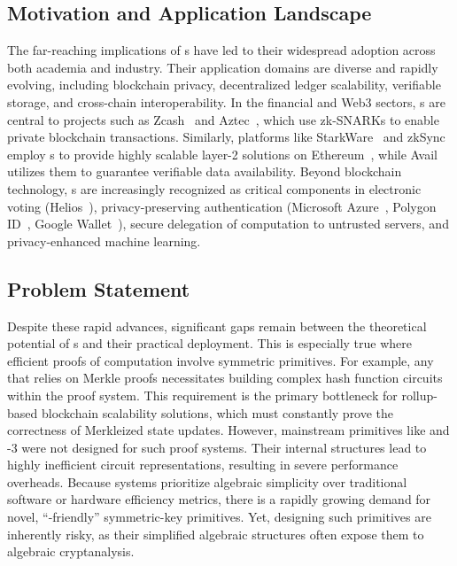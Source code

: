 	\subsection{Motivation and Application Landscape}
	The far-reaching implications of s have led to their widespread adoption across both academia and industry.
	Their application domains are diverse and rapidly evolving, including blockchain privacy, decentralized ledger scalability, verifiable storage, and cross-chain interoperability. 
	In the financial and Web3 sectors, s are central to projects such as Zcash~\cite{zcash} and Aztec~\cite{aztec}, which use zk-SNARKs to enable private blockchain transactions.
	Similarly, platforms like StarkWare~\cite{starkware} and zkSync~\cite{zksync} employ s to provide highly scalable layer-2 solutions on Ethereum~\cite{ethereum}, while Avail~\cite{avail} utilizes them to guarantee verifiable data availability.
	Beyond blockchain technology, s are increasingly recognized as critical components in electronic voting (Helios~\cite{helios}), privacy-preserving authentication (Microsoft Azure~\cite{azureprivacy}, Polygon ID~\cite{polygonid}, Google Wallet~\cite{googlewallet}), secure delegation of computation to untrusted servers, and privacy-enhanced machine learning.
	
	\subsection{Problem Statement}
	Despite these rapid advances, significant gaps remain between the theoretical potential of s and their practical deployment.
	This is especially true where efficient proofs of computation involve symmetric primitives.
	For example, any  that relies on Merkle proofs necessitates building complex hash function circuits within the proof system.
	This requirement is the primary bottleneck for rollup-based blockchain scalability solutions, which must constantly prove the correctness of Merkleized state updates.
	However, mainstream primitives like  and -3 were not designed for such proof systems.
	Their internal structures lead to highly inefficient circuit representations, resulting in severe performance overheads.
	Because  systems prioritize algebraic simplicity over traditional software or hardware efficiency metrics, there is a rapidly growing demand for novel, ``-friendly'' symmetric-key primitives.
	Yet, designing such primitives are inherently risky, as their simplified algebraic structures often expose them to algebraic cryptanalysis.
	
